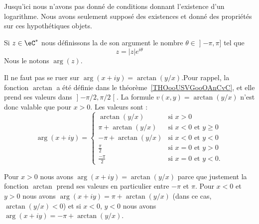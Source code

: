 \begin{remark}
    Jusqu'ici nous n'avons pas donné de conditions donnant l'existence d'un logarithme. Nous avons seulement supposé des existences et donné des propriétés sur ces hypothétiques objets.
\end{remark}

\begin{definition}
Si \( z\in \eC^*\) nous définissons la  de son argument le nombre \( \theta\in \mathopen] -\pi , \pi \mathclose]\) tel que
\begin{equation}
    z=| z | e^{i\theta}
\end{equation}
Nous le notons \( \arg(z)\).
\end{definition}

\begin{normaltext}      \label{NORMooOGHNooYriCBH}
    Il ne faut pas se ruer sur \( \arg(x+iy)=\arctan(y/x)\).Pour rappel, la fonction \( \arctan\) a été définie dans le théorème~\ref{THOooUSVGooOAnCvC}, et elle prend ses valeurs dans \( \mathopen] -\pi/2 , \pi/2 \mathclose[\). La formule \( v(x,y)=\arctan(y/x)\) n'est donc valable que pour \( x>0\). Les valeurs sont :
        \begin{equation}        \label{EQooPJVFooSEKTny}
            \arg(x+iy)=\begin{cases}
                 \arctan(y/x)   &   \text{si } x>0\\
                 \pi+\arctan(y/x)    &    \text{si } x<0\text{ et }y\geq 0 \\
                 -\pi+\arctan(y/x)    &    \text{si } x<0 \text{ et }y<0\\
                 \frac{ \pi }{ 2 }    &    \text{si } x=0 \text{ et }y>0\\
                 \frac{- \pi }{ 2 }    &    \text{si } x=0 \text{ et }y<0.
            \end{cases}
        \end{equation}

    Pour \( x>0\) nous avons \( \arg(x+iy)=\arctan(y/x)  \) parce que justement la fonction \( \arctan\) prend ses valeurs en particulier entre \( -\pi\) et \( \pi\). Pour \( x<0\) et \( y>0 \) nous avons \( \arg(x+iy)=\pi+\arctan(y/x)\) (dans ce cas, \( \arctan(y/x)<0\)) et si \( x<0\), \( y<0\) nous avons \( \arg(x+iy)=-\pi+\arctan(y/x)\).
\end{normaltext}

